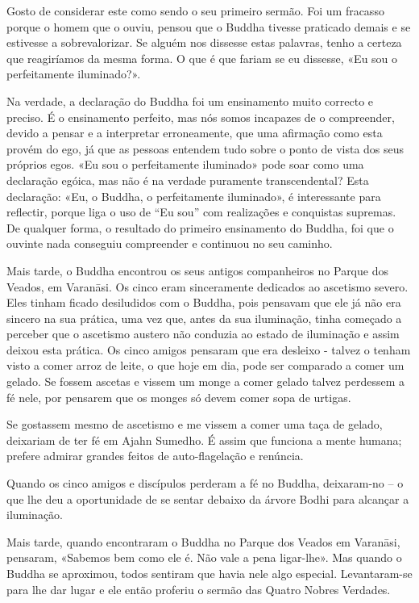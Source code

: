 Gosto de considerar este como sendo o seu primeiro sermão. Foi um fracasso
porque o homem que o ouviu, pensou que o Buddha tivesse praticado demais e se
estivesse a sobrevalorizar. Se alguém nos dissesse estas palavras, tenho a
certeza que reagiríamos da mesma forma. O que é que fariam se eu dissesse, «Eu
sou o perfeitamente iluminado?».

Na verdade, a declaração do Buddha foi um ensinamento muito correcto e preciso.
É o ensinamento perfeito, mas nós somos incapazes de o compreender, devido a
pensar e a interpretar erroneamente, que uma afirmação como esta provém do ego,
já que as pessoas entendem tudo sobre o ponto de vista dos seus próprios egos.
«Eu sou o perfeitamente iluminado» pode soar como uma declaração egóica, mas não
é na verdade puramente transcendental? Esta declaração: «Eu, o Buddha, o
perfeitamente iluminado», é interessante para reflectir, porque liga o uso de
“Eu sou” com realizações e conquistas supremas. De qualquer forma, o resultado
do primeiro ensinamento do Buddha, foi que o ouvinte nada conseguiu compreender
e continuou no seu caminho.

Mais tarde, o Buddha encontrou os seus antigos companheiros no Parque dos
Veados, em Varanāsi. Os cinco eram sinceramente dedicados ao ascetismo severo.
Eles tinham ficado desiludidos com o Buddha, pois pensavam que ele já não era
sincero na sua prática, uma vez que, antes da sua iluminação, tinha começado a
perceber que o ascetismo austero não conduzia ao estado de iluminação e assim
deixou esta prática. Os cinco amigos pensaram que era desleixo - talvez o tenham
visto a comer arroz de leite, o que hoje em dia, pode ser comparado a comer um
gelado. Se fossem ascetas e vissem um monge a comer gelado talvez perdessem a fé
nele, por pensarem que os monges só devem comer sopa de urtigas.

Se gostassem mesmo de ascetismo e me vissem a comer uma taça de gelado,
deixariam de ter fé em Ajahn Sumedho. É assim que funciona a mente humana;
prefere admirar grandes feitos de auto-flagelação e renúncia.

Quando os cinco amigos e discípulos perderam a fé no Buddha, deixaram-no – o que
lhe deu a oportunidade de se sentar debaixo da árvore Bodhi para alcançar a
iluminação.

Mais tarde, quando encontraram o Buddha no Parque dos Veados em Varanāsi,
pensaram, «Sabemos bem como ele é. Não vale a pena ligar-lhe». Mas quando o
Buddha se aproximou, todos sentiram que havia nele algo especial. Levantaram-se
para lhe dar lugar e ele então proferiu o sermão das Quatro Nobres Verdades.

